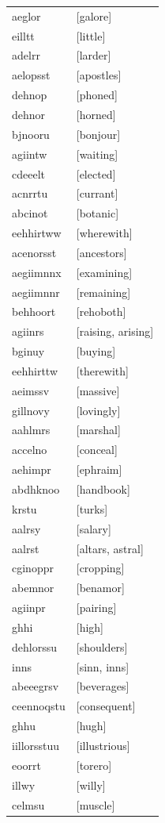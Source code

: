 \documentclass{article}
\begin{document}
\begin{tabular}{ll}
aeglor & [galore] \\
eilltt & [little] \\
adelrr & [larder] \\
aelopsst & [apostles] \\
dehnop & [phoned] \\
dehnor & [horned] \\
bjnooru & [bonjour] \\
agiintw & [waiting] \\
cdeeelt & [elected] \\
acnrrtu & [currant] \\
abcinot & [botanic] \\
eehhirtww & [wherewith] \\
acenorsst & [ancestors] \\
aegiimnnx & [examining] \\
aegiimnnr & [remaining] \\
behhoort & [rehoboth] \\
agiinrs & [raising, arising] \\
bginuy & [buying] \\
eehhirttw & [therewith] \\
aeimssv & [massive] \\
gillnovy & [lovingly] \\
aahlmrs & [marshal] \\
accelno & [conceal] \\
aehimpr & [ephraim] \\
abdhknoo & [handbook] \\
krstu & [turks] \\
aalrsy & [salary] \\
aalrst & [altars, astral] \\
cginoppr & [cropping] \\
abemnor & [benamor] \\
agiinpr & [pairing] \\
ghhi & [high] \\
dehlorssu & [shoulders] \\
inns & [sinn, inns] \\
abeeegrsv & [beverages] \\
ceennoqstu & [consequent] \\
ghhu & [hugh] \\
iillorsstuu & [illustrious] \\
eoorrt & [torero] \\
illwy & [willy] \\
celmsu & [muscle] \\

\end{tabular}
\end{document}
